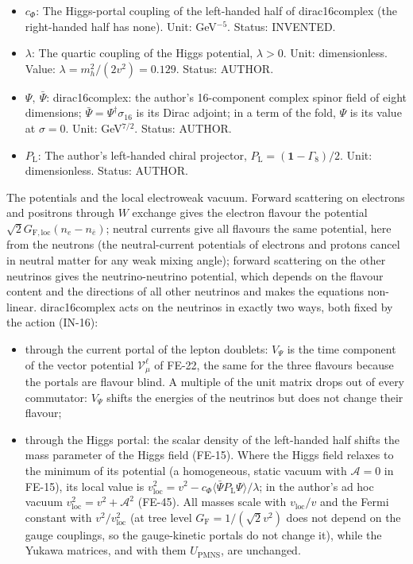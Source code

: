 \documentclass[
  10pt,
]{article}
\providecommand{\tightlist}{%
  \setlength{\itemsep}{0pt}\setlength{\parskip}{0pt}}
\begin{document}
\begin{itemize}
  GeV. Status: AUTHOR.
\item
  \(c_\Phi\): The Higgs-portal coupling of the left-handed half of
  dirac16complex (the right-handed half has none). Unit: GeV\(^{-5}\).
  Status: INVENTED.
\item
  \(\lambda\): The quartic coupling of the Higgs potential,
  \(\lambda > 0\). Unit: dimensionless. Value:
  \(\lambda = m_h^2/(2v^2) = 0.129\). Status: AUTHOR.
\item
  \(\Psi,\ \bar\Psi\): dirac16complex: the author's 16-component complex
  spinor field of eight dimensions;
  \(\bar\Psi = \Psi^\dagger\sigma_{16}\) is its Dirac adjoint; in a term
  of the fold, \(\Psi\) is its value at \(\sigma = 0\). Unit:
  GeV\(^{7/2}\). Status: AUTHOR.
\item
  \(P_{\mathrm{L}}\): The author's left-handed chiral projector,
  \(P_{\mathrm{L}} = (\mathbf{1} - \Gamma_8)/2\). Unit: dimensionless.
  Status: AUTHOR.
\end{itemize}

The potentials and the local electroweak vacuum. Forward scattering on
electrons and positrons through \(W\) exchange gives the electron
flavour the potential \(\sqrt2G_{\mathrm{F,loc}}(n_e - n_{\bar e})\);
neutral currents give all flavours the same potential, here from the
neutrons (the neutral-current potentials of electrons and protons cancel
in neutral matter for any weak mixing angle); forward scattering on the
other neutrinos gives the neutrino-neutrino potential, which depends on
the flavour content and the directions of all other neutrinos and makes
the equations non-linear. dirac16complex acts on the neutrinos in
exactly two ways, both fixed by the action (IN-16):

\begin{itemize}
\tightlist
\item
  through the current portal of the lepton doublets: \(V_\Psi\) is the
  time component of the vector potential \(\mathcal{V}^{\ell}_\mu\) of
  FE-22, the same for the three flavours because the portals are flavour
  blind. A multiple of the unit matrix drops out of every commutator:
  \(V_\Psi\) shifts the energies of the neutrinos but does not change
  their flavour;
\item
  through the Higgs portal: the scalar density of the left-handed half
  shifts the mass parameter of the Higgs field (FE-15). Where the Higgs
  field relaxes to the minimum of its potential (a homogeneous, static
  vacuum with \(\mathcal{A} = 0\) in FE-15), its local value is
  \(v_{\mathrm{loc}}^2 = v^2 - c_\Phi\langle\bar\Psi P_{\mathrm{L}}\Psi\rangle/\lambda\);
  in the author's ad hoc vacuum
  \(v_{\mathrm{loc}}^2 = v^2 + \mathcal{A}^2\) (FE-45). All masses scale
  with \(v_{\mathrm{loc}}/v\) and the Fermi constant with
  \(v^2/v_{\mathrm{loc}}^2\) (at tree level
  \(G_{\mathrm{F}} = 1/(\sqrt2 v^2)\) does not depend on the gauge
  couplings, so the gauge-kinetic portals do not change it), while the
  Yukawa matrices, and with them \(U_{\mathrm{PMNS}}\), are unchanged.
\end{itemize}
\end{document}
